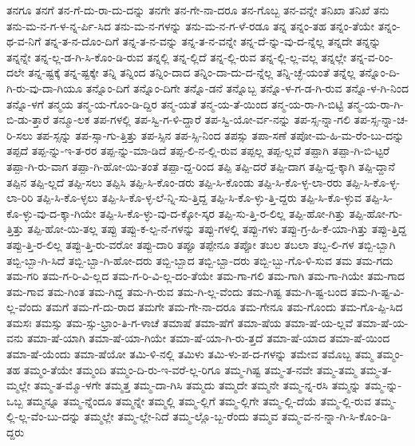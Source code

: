 {ತನಗೂ
ತನಗೆ
ತನ-ಗೆ-ದು-ರಾ-ದು-ದನ್ನು
ತನಗೇ
ತನ-ಗೇ-ನಾ-ದರೂ
ತನ-ಗೊಬ್ಬ
ತನ-ವನ್ನೇ
ತನಿಖಾ
ತನಿಖೆ
ತನು
ತನು-ಮ-ನ-ಗ-ಳ-ನ್ನ-ರ್ಪಿ-ಸಿದ
ತನು-ಮ-ನ-ಗಳನ್ನು
ತನು-ಮ-ನ-ಗ-ಳೆ-ರಡೂ
ತನ್ನ
ತನ್ನಂ-ತಹ
ತನ್ನಂ-ತೆಯೇ
ತನ್ನಂ-ಥ-ವ-ನಿಗೆ
ತನ್ನ-ತ-ನ-ದೊಂ-ದಿಗೆ
ತನ್ನ-ತ-ನ-ವನ್ನು
ತನ್ನ-ತ-ನ-ವನ್ನೇ
ತನ್ನ-ದೆ-ನ್ನು-ವು-ದ-ನ್ನೆಲ್ಲ
ತನ್ನದೇ
ತನ್ನನ್ನು
ತನ್ನನ್ನೇ
ತನ್ನ-ಲ್ಲ-ಡ-ಗಿ-ಸಿ-ಕೊಂ-ಡಿ-ರುವ
ತನ್ನಲ್ಲಿ
ತನ್ನ-ಲ್ಲಿದೆ
ತನ್ನ-ಲ್ಲಿ-ರುವ
ತನ್ನ-ಲ್ಲಿ-ಲ್ಲ-ವಲ್ಲ
ತನ್ನಲ್ಲೇ
ತನ್ನ-ವ-ರಿಂ-ದಲೇ
ತನ್ನ-ಷ್ಟಕ್ಕೆ
ತನ್ನ-ಷ್ಟಕ್ಕೇ
ತನ್ನಿ
ತನ್ನಿಂದ
ತನ್ನಿಂ-ದಾದ
ತನ್ನಿಂ-ದಾ-ದು-ದ-ನ್ನೆಲ್ಲ
ತನ್ನಿ-ಚ್ಛೆ-ಯಂತೆ
ತನ್ನೆಲ್ಲ
ತನ್ನೊಂ-ದಿ-ಗಿ-ರು-ವು-ದಾ-ಗಿಯೂ
ತನ್ನೊಂ-ದಿಗೆ
ತನ್ನೊಂ-ದಿಗೇ
ತನ್ನೊ-ಡನೆ
ತನ್ನೊಬ್ಬ
ತನ್ನೊ-ಳ-ಗ-ಡ-ಗಿ-ರುವ
ತನ್ನೊ-ಳ-ಗಿ-ನಿಂದ
ತನ್ನೊ-ಳಗೆ
ತನ್ಮಯ
ತನ್ಮ-ಯ-ಗೊಂ-ಡಿ-ದ್ದಿರ
ತನ್ಮ-ಯತೆ
ತನ್ಮ-ಯ-ತೆ-ಯಿಂದ
ತನ್ಮ-ಯ-ರಾ-ಗಿ-ಬಿಟ್ಟಿ
ತನ್ಮ-ಯ-ರಾ-ಗಿ-ಬಿ-ಡು-ತ್ತಾರೆ
ತನ್ಮೂ-ಲಕ
ತಪ-ಗಳಲ್ಲಿ
ತಪ-ಸ್ವಿ-ಗ-ಳಿ-ದ್ದಾರೆ
ತಪ-ಸ್ವಿ-ಯೋ-ರ್ವ-ನನ್ನು
ತಪ-ಸ್ಸ-ನ್ನಾ-ಗಲಿ
ತಪ-ಸ್ಸ-ನ್ನಾ-ಚ-ರಿ-ಸಲು
ತಪ-ಸ್ಸನ್ನು
ತಪ-ಸ್ಸಾ-ಗು-ತ್ತಿತ್ತು
ತಪ-ಸ್ಸಿನ
ತಪ-ಸ್ಸಿ-ನಿಂದ
ತಪಸ್ಸು
ತಪಾ-ಸಣೆ
ತಪೋ-ಮ-ಹಿ-ಮ-ರೆಂ-ಬು-ದನ್ನು
ತಪ್ಪದೆ
ತಪ್ಪ-ನ್ನು-ಇ-ತ-ರರ
ತಪ್ಪ-ನ್ನು-ಮಾ-ಡಿದೆ
ತಪ್ಪ-ಲಿ-ನ-ಲ್ಲಿ-ರುವ
ತಪ್ಪಲ್ಲ
ತಪ್ಪ-ಲ್ಲವೆ
ತಪ್ಪಾಗಿ
ತಪ್ಪಾ-ಗಿ-ಬಿ-ಟ್ಟರೆ
ತಪ್ಪಾ-ಗಿ-ರು-ವಾಗ
ತಪ್ಪಾ-ಗಿ-ಹೋ-ಯಿ-ತಂತೆ
ತಪ್ಪಾ-ದ್ದ-ರಿಂದ
ತಪ್ಪಿ
ತಪ್ಪಿ-ದರೆ
ತಪ್ಪಿ-ದಾಗ
ತಪ್ಪಿ-ದ್ದ-ಕ್ಕಾಗಿ
ತಪ್ಪಿ-ದ್ದಾನೆ
ತಪ್ಪಿನ
ತಪ್ಪಿ-ಲ್ಲದೆ
ತಪ್ಪಿ-ಸಲು
ತಪ್ಪಿಸಿ
ತಪ್ಪಿ-ಸಿ-ಕೊಂ-ಡರು
ತಪ್ಪಿ-ಸಿ-ಕೊಂಡು
ತಪ್ಪಿ-ಸಿ-ಕೊ-ಳ್ಳ-ಲಾ-ರರು
ತಪ್ಪಿ-ಸಿ-ಕೊ-ಳ್ಳ-ಲಾ-ರಿರಿ
ತಪ್ಪಿ-ಸಿ-ಕೊ-ಳ್ಳಲು
ತಪ್ಪಿ-ಸಿ-ಕೊ-ಳ್ಳ-ಲೆ-ನ್ನಿ-ಸು-ತ್ತಿದ್ದ
ತಪ್ಪಿ-ಸಿ-ಕೊ-ಳ್ಳು-ತ್ತಿ-ದ್ದರು
ತಪ್ಪಿ-ಸಿ-ಕೊ-ಳ್ಳುವ
ತಪ್ಪಿ-ಸಿ-ಕೊ-ಳ್ಳು-ವು-ದ-ಕ್ಕಾ-ಗಿಯೇ
ತಪ್ಪಿ-ಸಿ-ಕೊ-ಳ್ಳು-ವು-ದ-ಕ್ಕೋ-ಸ್ಕರ
ತಪ್ಪಿ-ಸು-ತ್ತಿ-ರ-ಲಿಲ್ಲ
ತಪ್ಪಿ-ಹೋ-ಗಿತ್ತು
ತಪ್ಪಿ-ಹೋ-ಗು-ತ್ತಿತ್ತು
ತಪ್ಪಿ-ಹೋ-ಯಿ-ತಲ್ಲ
ತಪ್ಪು
ತಪ್ಪು-ಕ-ಲ್ಪ-ನೆ-ಗಳನ್ನು
ತಪ್ಪು-ಗಳಲ್ಲಿ
ತಪ್ಪು-ಗಳು
ತಪ್ಪು-ಗ್ರ-ಹಿ-ಕೆ-ಯಾ-ಗಿತ್ತು
ತಪ್ಪು-ತ್ತಿದ್ದ
ತಪ್ಪು-ತ್ತಿ-ರ-ಲಿಲ್ಲ
ತಪ್ಪು-ತ್ತಿ-ರು-ವರೋ
ತಪ್ಪು-ದಾರಿ
ತಪ್ಪೂ
ತಪ್ಪೇನೂ
ತಪ್ಪೋ
ತಬಲ
ತಬಲಾ
ತಬ್ಬ-ಲಿ-ಗಳ
ತಬ್ಬಿ-ಬ್ಬಾಗಿ
ತಬ್ಬಿ-ಬ್ಬಾ-ಗಿ-ಸಿದೆ
ತಬ್ಬಿ-ಬ್ಬಾ-ಗಿ-ಹೋ-ದರು
ತಬ್ಬಿ-ಬ್ಬಾದ
ತಬ್ಬಿ-ಬ್ಬಾ-ದರು
ತಬ್ಬಿ-ಬ್ಬು-ಗೊ-ಳಿ-ಸುವ
ತಮ
ತಮ-ಗದು
ತಮ-ಗರಿ
ತಮ-ಗ-ರಿ-ವಿ-ಲ್ಲದ
ತಮ-ಗ-ರಿ-ವಿ-ಲ್ಲ-ದಂ-ತೆಯೇ
ತಮ-ಗಾ-ಗಲಿ
ತಮ-ಗಾಗಿ
ತಮ-ಗಾ-ಗಿಯೇ
ತಮ-ಗಾದ
ತಮ-ಗಾವ
ತಮ-ಗಿಂತ
ತಮ-ಗಿದ್ದ
ತಮ-ಗಿ-ರುವ
ತಮ-ಗಿ-ಲ್ಲ-ವೆಂದು
ತಮ-ಗಿಷ್ಟ
ತಮ-ಗಿ-ಷ್ಟ-ಬಂದ
ತಮ-ಗಿ-ಷ್ಟ-ವಿ-ಲ್ಲ-ವೆಂದು
ತಮಗೆ
ತಮ-ಗೆ-ದು-ರಾದ
ತಮಗೇ
ತಮ-ಗೇ-ನಾ-ದರೂ
ತಮ-ಗೇನೂ
ತಮ-ಗೊಂದು
ತಮ-ಗೊ-ಪ್ಪಿ-ಸಿದ
ತಮಸಃ
ತಮಸ್ಸು
ತಮ-ಸ್ಸು-ಭ್ರಾಂ-ತಿ-ಗ-ಳಾಚೆ
ತಮಾಷೆ
ತಮಾ-ಷೆಗೆ
ತಮಾ-ಷೆಯ
ತಮಾ-ಷೆ-ಯ-ಲ್ಲವೆ
ತಮಾ-ಷೆ-ಯ-ವನು
ತಮಾ-ಷೆ-ಯಾಗಿ
ತಮಾ-ಷೆ-ಯಾ-ಗಿಯೇ
ತಮಾ-ಷೆ-ಯಾ-ಗಿ-ರು-ತ್ತದೆ
ತಮಾ-ಷೆ-ಯಾದ
ತಮಾ-ಷೆ-ಯಿಂದ
ತಮಾ-ಷೆ-ಯೆಂದು
ತಮಾ-ಷೆಯೋ
ತಮಿ-ಳಿ-ನಲ್ಲಿ
ತಮಿಳು
ತಮಿ-ಳು-ಪ-ದ-ಗಳನ್ನು
ತಮೇವ
ತಮೊಬ್ಬ
ತಮ್ಮ
ತಮ್ಮಂ-ತಹ
ತಮ್ಮಂ-ತೆಯೇ
ತಮ್ಮಂದಿ
ತಮ್ಮಂ-ದಿ-ರು-ಇ-ವರೆ-ಲ್ಲ-ರಿಗೂ
ತಮ್ಮ-ಗಿಷ್ಟ
ತಮ್ಮ-ತ-ನವೇ
ತಮ್ಮ-ತಮ್ಮ
ತಮ್ಮ-ತ-ಮ್ಮಲ್ಲೇ
ತಮ್ಮ-ತ-ಮ್ಮೊ-ಳಗೇ
ತಮ್ಮತ್ತ
ತಮ್ಮ-ದಾ-ಗಿಸಿ
ತಮ್ಮದು
ತಮ್ಮದೇ
ತಮ್ಮನೇ
ತಮ್ಮ-ನ್ನ-ರಸಿ
ತಮ್ಮನ್ನು
ತಮ್ಮ-ನ್ನು-ಒಬ್ಬ
ತಮ್ಮನ್ನೂ
ತಮ್ಮ-ನ್ನೆಂದೂ
ತಮ್ಮನ್ನೇ
ತಮ್ಮಲ್ಲಿ
ತಮ್ಮ-ಲ್ಲಿಗೆ
ತಮ್ಮ-ಲ್ಲಿಗೇ
ತಮ್ಮ-ಲ್ಲಿ-ದೆಯೆ
ತಮ್ಮ-ಲ್ಲಿ-ರುವ
ತಮ್ಮ-ಲ್ಲಿ-ಲ್ಲ-ವೆಂ-ಬು-ದನ್ನು
ತಮ್ಮಲ್ಲೇ
ತಮ್ಮ-ಲ್ಲೇ-ನಿದೆ
ತಮ್ಮ-ಲ್ಲೊ-ಬ್ಬ-ರೆಂದು
ತಮ್ಮವ
ತಮ್ಮ-ವ-ನ-ನ್ನಾ-ಗಿ-ಸಿ-ಕೊಂ-ಡಿ-ದ್ದರು
}
